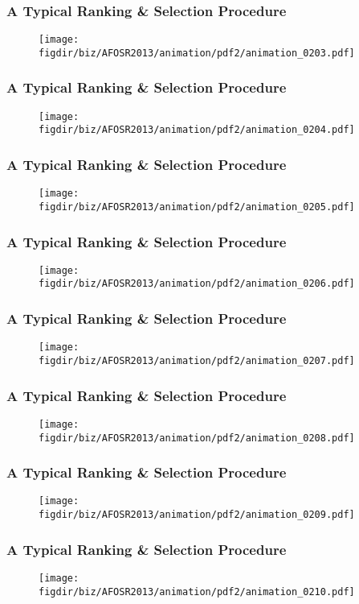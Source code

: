 \documentclass[13pt]{beamer}
\newcommand{\figdir}{../../fig}
\begin{document}
\begin{frame}\frametitle{A Typical Ranking \& Selection Procedure}\begin{figure}\texttt{[image: \\figdir/biz/AFOSR2013/animation/pdf2/animation\_0203.pdf]}\end{figure}\end{frame}
\begin{frame}\frametitle{A Typical Ranking \& Selection Procedure}\begin{figure}\texttt{[image: \\figdir/biz/AFOSR2013/animation/pdf2/animation\_0204.pdf]}\end{figure}\end{frame}
\begin{frame}\frametitle{A Typical Ranking \& Selection Procedure}\begin{figure}\texttt{[image: \\figdir/biz/AFOSR2013/animation/pdf2/animation\_0205.pdf]}\end{figure}\end{frame}
\begin{frame}\frametitle{A Typical Ranking \& Selection Procedure}\begin{figure}\texttt{[image: \\figdir/biz/AFOSR2013/animation/pdf2/animation\_0206.pdf]}\end{figure}\end{frame}
\begin{frame}\frametitle{A Typical Ranking \& Selection Procedure}\begin{figure}\texttt{[image: \\figdir/biz/AFOSR2013/animation/pdf2/animation\_0207.pdf]}\end{figure}\end{frame}
\begin{frame}\frametitle{A Typical Ranking \& Selection Procedure}\begin{figure}\texttt{[image: \\figdir/biz/AFOSR2013/animation/pdf2/animation\_0208.pdf]}\end{figure}\end{frame}
\begin{frame}\frametitle{A Typical Ranking \& Selection Procedure}\begin{figure}\texttt{[image: \\figdir/biz/AFOSR2013/animation/pdf2/animation\_0209.pdf]}\end{figure}\end{frame}
\begin{frame}\frametitle{A Typical Ranking \& Selection Procedure}\begin{figure}\texttt{[image: \\figdir/biz/AFOSR2013/animation/pdf2/animation\_0210.pdf]}\end{figure}\end{frame}
\end{document}
